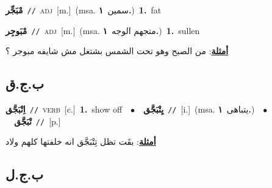 \documentclass[10pt,a4paper,twoside]{article} %
\begin{document}
\begin{multicols}{2}
{{{{\setlength\topsep{0pt}\textbf{\foreignlanguage{arabic}{مْبَجِّر}}\ {\color{gray}\texttt{//}\color{black}}\ \textsc{adj}\ [m.]\ \color{gray}(msa. \foreignlanguage{arabic}{سمين}~\foreignlanguage{arabic}{\textbf{١.}})\color{black}\ \textbf{1.}~fat\ 

{\setlength\topsep{0pt}\textbf{\foreignlanguage{arabic}{مْبَوجِر}}\ {\color{gray}\texttt{//}\color{black}}\ \textsc{adj}\ [m.]\ \color{gray}(msa. \foreignlanguage{arabic}{متجهم الوجه}~\foreignlanguage{arabic}{\textbf{١.}})\color{black}\ \textbf{1.}~sullen\  \begin{flushright}\color{gray}\foreignlanguage{arabic}{\textbf{\underline{\foreignlanguage{arabic}{أمثلة}}}: من الصبح وهو تحت الشمس بشتغل مش شايفه مبوجر ؟}\end{flushright}\color{black}} \vspace{2mm}

\vspace{-3mm}
\subsection*{\color{blue}\foreignlanguage{arabic}{ب.ج.ق}\color{blue}{}} 

{\setlength\topsep{0pt}\textbf{\foreignlanguage{arabic}{اِتْبَجَّق}}\ {\color{gray}\texttt{//}\color{black}}\ \textsc{verb}\ [c.]\ \textbf{1.}~show off\ \ $\bullet$\ \ \setlength\topsep{0pt}\textbf{\foreignlanguage{arabic}{يِتْبَجَّق}}\ {\color{gray}\texttt{//}\color{black}}\ [i.]\ \color{gray}(msa. \foreignlanguage{arabic}{يتباهى}~\foreignlanguage{arabic}{\textbf{١.}})\color{black}\ \ $\bullet$\ \ \setlength\topsep{0pt}\textbf{\foreignlanguage{arabic}{تْبَجَّق}}\ {\color{gray}\texttt{//}\color{black}}\ [p.]\  \begin{flushright}\color{gray}\foreignlanguage{arabic}{\textbf{\underline{\foreignlanguage{arabic}{أمثلة}}}: بقَت تظل تِتْبَجَّق انه خلفتها كلهم ولاد}\end{flushright}\color{black}} \vspace{2mm}

\vspace{-3mm}
\subsection*{\color{blue}\foreignlanguage{arabic}{ب.ج.ل}\color{blue}{}} 

}}}}
\end{multicols}
\end{document}
